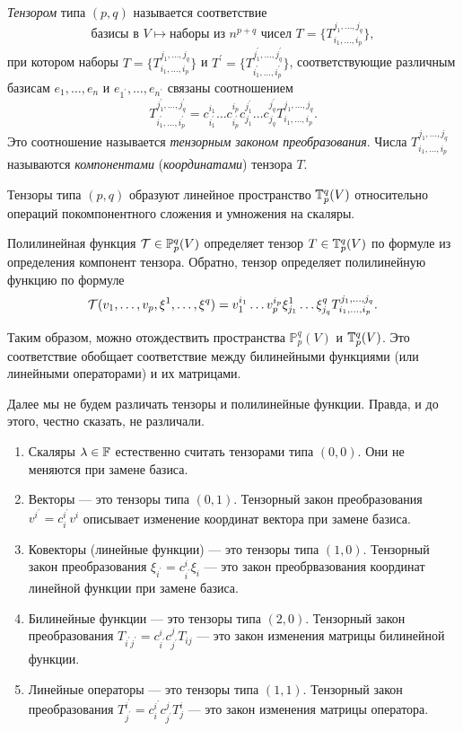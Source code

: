 \begin{definition}
    \textit{Тензором} типа $(p, q)$ называется соответствие
    \[
        \text{базисы в $V$} \mapsto \text{наборы из $n^{p + q}$ чисел $T = \{T_{i_1, \ldots, i_p}^{j_1, \ldots, j_q}\}$},
    \]
    при котором наборы $T = \{T_{i_1, \ldots, i_p}^{j_1, \ldots, j_q}\}$ и $T^\prime = \{T_{i_1^\prime, \ldots, i_p^\prime}^{j_1^\prime, \ldots, j_q^\prime}\}$, соответствующие различным базисам $e_1, \ldots, e_n$ и $e_{1^\prime}, \ldots, e_{n^\prime}$ связаны соотношением
    \[
        T_{i_1^\prime, \ldots, i_p^\prime}^{j_1^\prime, \ldots, j_q^\prime} = c^{i_1}_{i_1^\prime}\ldots c^{i_p}_{i_p^\prime}c^{j_1^\prime}_{j_1}\ldots c^{j_q^\prime}_{j_q}T_{i_1, \ldots, i_p}^{j_1, \ldots, j_q}.
    \]
    Это соотношение называется \textit{тензорным законом преобразования}. Числа $T_{i_1, \ldots, i_p}^{j_1, \ldots, j_q}$ называются \textit{компонентами} (\textit{координатами}) тензора $T$.
\end{definition}

Тензоры типа $(p, q)$ образуют линейное пространство $\mathbb{T}_p^q(V)$ относительно операций покомпонентного сложения и умножения на скаляры.

Полилинейная функция $\mathcal{T} \in \mathbb{P}_p^q(V)$ определяет тензор $T \in \mathbb{T}_p^q(V)$ по формуле из определения компонент тензора. Обратно, тензор определяет полилинейную функцию по формуле
\[
    \mathcal{T}(v_1, \ldots, v_p, \xi^1, \ldots, \xi^q) = v_1^{i_1}\ldots v_p^{i_p}\xi^1_{j_1}\ldots\xi^q_{j_q}T_{i_1, \ldots, i_p}^{j_1, \ldots, j_q}.
\]

Таким образом, можно отождествить пространства $\mathbb{P}_p^q(V)$ и $\mathbb{T}_p^q(V)$. Это соответствие обобщает соответствие между билинейными функциями (или линейными операторами) и их матрицами.

Далее мы не будем различать тензоры и полилинейные функции. Правда, и до этого, честно сказать, не различали.

\begin{example}
    \begin{enumerate}
        \item Скаляры $\lambda \in \mathbb{F}$ естественно считать тензорами типа $(0, 0)$. Они не меняются при замене базиса.
        \item Векторы --- это тензоры типа $(0, 1)$. Тензорный закон преобразования $v^{i^\prime} = c^{i^\prime}_iv^i$ описывает изменение координат вектора при замене базиса.
        \item Ковекторы (линейные функции) --- это тензоры типа $(1, 0)$. Тензорный закон преобразования $\xi_{i^\prime} = c^i_{i^\prime}\xi_i$ --- это закон преобрвазования координат линейной функции при замене базиса.
        \item Билинейные функции --- это тензоры типа $(2, 0)$. Тензорный закон преобразования $T_{i^\prime j^\prime} = c^i_{i^\prime}c^j_{j^\prime}T_{ij}$ --- это закон изменения матрицы билинейной функции.
        \item Линейные операторы --- это тензоры типа $(1, 1)$. Тензорный закон преобразования $T^{i^\prime}_{j^\prime} = c^{i^\prime}_ic^j_{j^\prime}T^i_j$ --- это закон изменения матрицы оператора.
    \end{enumerate}
\end{example}

